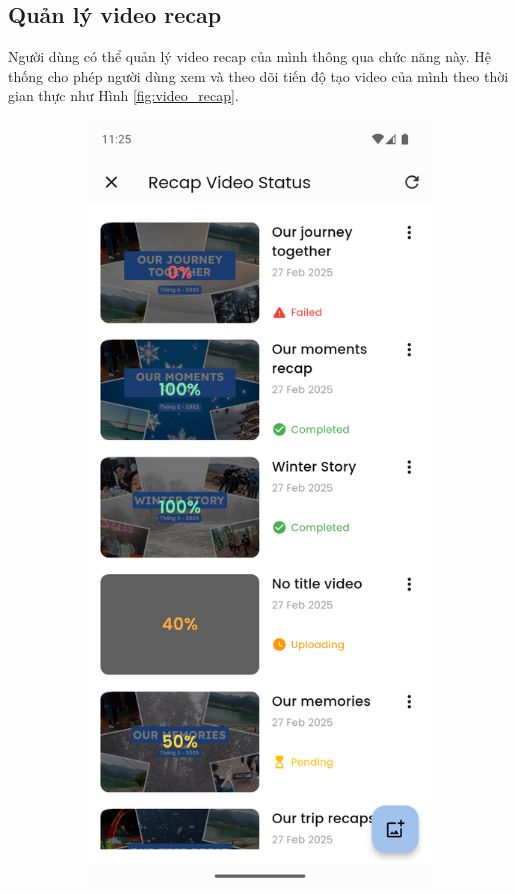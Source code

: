 \subsection{Quản lý video recap}

Người dùng có thể quản lý video recap của mình thông qua chức năng này. Hệ thống cho phép người dùng xem và theo dõi tiến độ tạo video của mình theo thời gian thực như Hình \ref{fig:video_recap}.

\begin{figure}[H]
    \centering
    \begin{subfigure}{0.32\textwidth}
        \includegraphics[width=1\linewidth]{figures/c4/4-2/video_1.png} 

\end{subfigure}
\end{figure}
